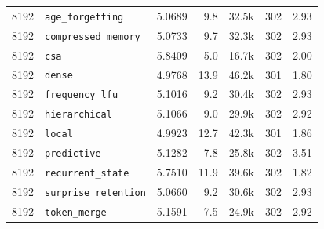 \begin{tabular}{@{}llrrrrr@{}}
8192 & \texttt{age\_forgetting} & 5.0689 & 9.8 & 32.5k & 302 & 2.93 \\
8192 & \texttt{compressed\_memory} & 5.0733 & 9.7 & 32.3k & 302 & 2.93 \\
8192 & \texttt{csa} & 5.8409 & 5.0 & 16.7k & 302 & 2.00 \\
8192 & \texttt{dense} & 4.9768 & 13.9 & 46.2k & 301 & 1.80 \\
8192 & \texttt{frequency\_lfu} & 5.1016 & 9.2 & 30.4k & 302 & 2.93 \\
8192 & \texttt{hierarchical} & 5.1066 & 9.0 & 29.9k & 302 & 2.92 \\
8192 & \texttt{local} & 4.9923 & 12.7 & 42.3k & 301 & 1.86 \\
8192 & \texttt{predictive} & 5.1282 & 7.8 & 25.8k & 302 & 3.51 \\
8192 & \texttt{recurrent\_state} & 5.7510 & 11.9 & 39.6k & 302 & 1.82 \\
8192 & \texttt{surprise\_retention} & 5.0660 & 9.2 & 30.6k & 302 & 2.93 \\
8192 & \texttt{token\_merge} & 5.1591 & 7.5 & 24.9k & 302 & 2.92 \\
\bottomrule
\end{tabular}
